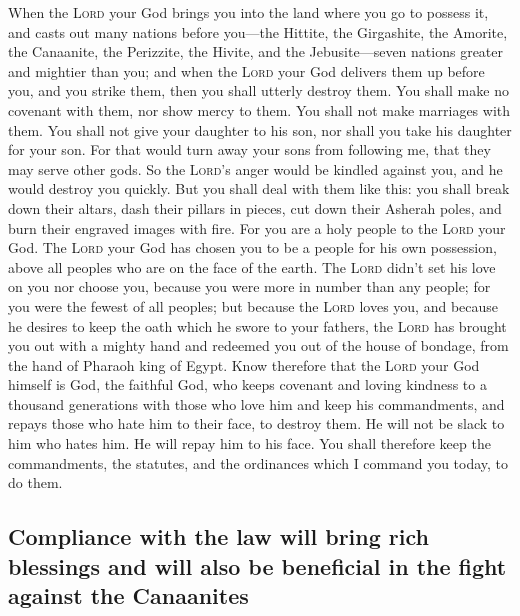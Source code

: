  When the \textsc{Lord} your God brings you into the land
where you go to possess it, and casts out many nations before you---the
Hittite, the Girgashite, the Amorite, the Canaanite, the Perizzite, the
Hivite, and the Jebusite---seven nations greater and mightier than you;
 and when the \textsc{Lord} your God delivers them up
before you, and you strike them, then you shall utterly destroy them.
You shall make no covenant with them, nor show mercy to them.
 You shall not make marriages with them. You shall not
give your daughter to his son, nor shall you take his daughter for your
son.  For that would turn away your sons from following
me, that they may serve other gods. So the \textsc{Lord}'s anger would
be kindled against you, and he would destroy you quickly. 
But you shall deal with them like this: you shall break down their
altars, dash their pillars in pieces, cut down their Asherah poles, and
burn their engraved images with fire.  For you are a holy
people to the \textsc{Lord} your God. The \textsc{Lord} your God has
chosen you to be a people for his own possession, above all peoples who
are on the face of the earth.  The \textsc{Lord} didn't
set his love on you nor choose you, because you were more in number than
any people; for you were the fewest of all peoples;  but
because the \textsc{Lord} loves you, and because he desires to keep the
oath which he swore to your fathers, the \textsc{Lord} has brought you
out with a mighty hand and redeemed you out of the house of bondage,
from the hand of Pharaoh king of Egypt.  Know therefore
that the \textsc{Lord} your God himself is God, the faithful God, who
keeps covenant and loving kindness to a thousand generations with those
who love him and keep his commandments,  and repays those
who hate him to their face, to destroy them. He will not be slack to him
who hates him. He will repay him to his face.  You shall
therefore keep the commandments, the statutes, and the ordinances which
I command you today, to do them.

\hypertarget{compliance-with-the-law-will-bring-rich-blessings-and-will-also-be-beneficial-in-the-fight-against-the-canaanites}{%
\subsection{Compliance with the law will bring rich blessings and will
also be beneficial in the fight against the
Canaanites}\label{compliance-with-the-law-will-bring-rich-blessings-and-will-also-be-beneficial-in-the-fight-against-the-canaanites}}

